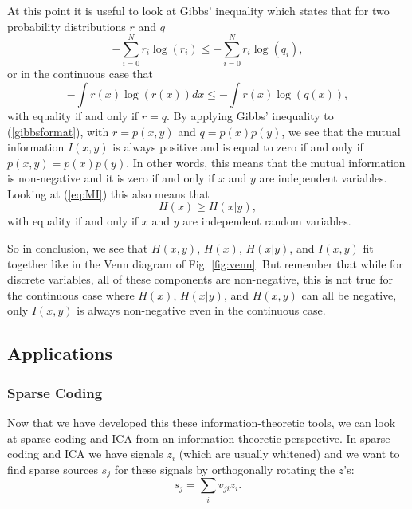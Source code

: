 \documentclass[]{article}
\begin{document}
At this point it is useful to look at Gibbs' inequality which states that for two probability distributions $r$ and $q$
\begin{equation}
\label{Gibbs}
- \sum_{i=0}^N r_i \log(r_i) \leq - \sum_{i=0}^N r_i \log(q_i) ,
\end{equation}
or in the continuous case that
\begin{equation}
\label{Gibbs}
- \int r(x) \log(r(x)) dx \leq - \int r(x) \log(q(x)) ,
\end{equation}
with equality if and only if $r = q $. By applying Gibbs' inequality to (\ref{gibbsformat}), with $r = p(x,y)$ and $q = p(x)p(y)$, we see that the mutual information $I(x,y)$ is always positive and is equal to zero if and only if $p(x,y) = p(x)p(y)$. In other words, this means that the mutual information is non-negative and it is zero if and only if $x$ and $y$ are independent variables. Looking at (\ref{eq:MI}) this also means that 
\begin{equation}
\label{Hcondsmaller}
  H(x) \geq H(x|y) ,
\end{equation}
with equality if and only if $x$ and $y$ are independent random variables.


So in conclusion, we see that $H(x,y)$, $H(x)$, $H(x|y)$, and $I(x,y)$ fit together like in the Venn diagram of Fig. \ref{fig:venn}. But remember that while for discrete variables, all of these components are non-negative, this is not true for the continuous case where  $H(x)$, $H(x|y)$, and $H(x,y)$ can all be negative, only $I(x,y)$ is always non-negative even in the continuous case. 

\subsection{Applications}
\label{applications}
\subsubsection{Sparse Coding}
\label{sparse-coding}

Now that we have developed this these information-theoretic tools, we can look at sparse coding and ICA from an information-theoretic perspective. In sparse coding and ICA we have signals $z_i$ (which are usually whitened) and we want to find sparse sources $s_j$ for these signals by orthogonally rotating the $z$'s:
\begin{equation}
\label{sparsetransformation}
s_j = \sum_i v_{j i} z_i .
\end{equation}
\end{document}
